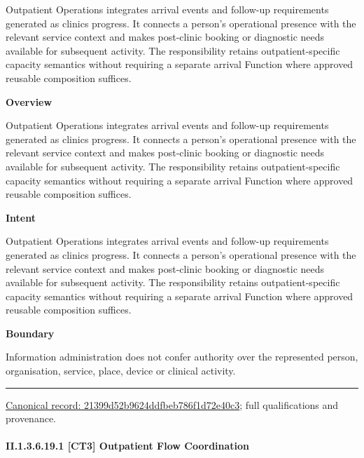 Outpatient Operations integrates arrival events and follow-up requirements generated as clinics progress. It connects a person's operational presence with the relevant service context and makes post-clinic booking or diagnostic needs available for subsequent activity. The responsibility retains outpatient-specific capacity semantics without requiring a separate arrival Function where approved reusable composition suffices.



\textbf{Overview}



Outpatient Operations integrates arrival events and follow-up requirements generated as clinics progress. It connects a person's operational presence with the relevant service context and makes post-clinic booking or diagnostic needs available for subsequent activity. The responsibility retains outpatient-specific capacity semantics without requiring a separate arrival Function where approved reusable composition suffices.



\textbf{Intent}



Outpatient Operations integrates arrival events and follow-up requirements generated as clinics progress. It connects a person's operational presence with the relevant service context and makes post-clinic booking or diagnostic needs available for subsequent activity. The responsibility retains outpatient-specific capacity semantics without requiring a separate arrival Function where approved reusable composition suffices.



\textbf{Boundary}



Information administration does not confer authority over the represented person, organisation, service, place, device or clinical activity.



\medskip\hrule\medskip

{\footnotesize \href{../../../../continuum/strategy/capability/21399d52b9624ddfbeb786f1d72e40c3.md}{Canonical record: 21399d52b9624ddfbeb786f1d72e40c3}; full qualifications and provenance.}\par
\paragraph*{II.1.3.6.19.1 [CT3] Outpatient Flow Coordination}
\label{navigation:II.1.3.6.19.1}

